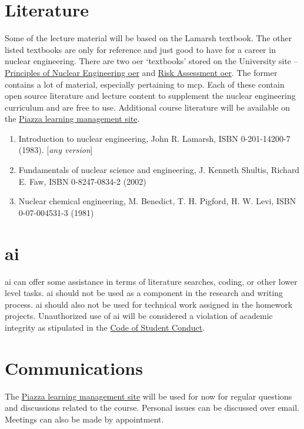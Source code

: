 \documentclass[11pt,letterpaper]{article}
\newcommand{\acf}{\acrfull} %
\newcommand{\acl}{\acrlong} %
\newcommand{\acs}{\acrshort} %
\begin{document}
\section{Literature} 
Some of the lecture material will be based on the Lamarsh textbook. The other listed textbooks are only for reference and just good to have for a career in nuclear engineering. There are two \acf{oer} `textbooks' stored on the University site -- \href{https://uidaho.pressbooks.pub/nuclearengineering/}{Principles of Nuclear Engineering \acs{oer}} and \href{https://uidaho.pressbooks.pub/riskassessment/}{Risk Assessment \acs{oer}}. The former contains a lot of material, especially pertaining to \acs{mcp}. Each of these contain open source literature and lecture content to supplement the nuclear engineering curriculum and are free to use. Additional course literature will be available on the \href{https://piazza.com/}{Piazza learning management site}. 
\begin{enumerate}[begin-vspace=0ex,item-vspace=-0.5ex,begin-extra-vspace=1ex,para-vspace=1ex,left-margin=3.9ex,item-indent=0ex,item-label=(\arabic*)]
    \item Introduction to nuclear engineering, John R. Lamarsh, ISBN 0-201-14200-7 (1983). [\textit{any version}]
    \item Fundamentals of nuclear science and engineering, J. Kenneth Shultis, Richard E. Faw, ISBN 0-8247-0834-2 (2002)
    \item Nuclear chemical engineering, M. Benedict, T. H. Pigford, H. W. Levi, ISBN 0-07-004531-3 (1981)
\end{enumerate}


\section{\acl{ai}}
\acs{ai} can offer some assistance in terms of literature searches, coding, or other lower level tasks. \acs{ai} should not be used as a component in the research and writing process. \acs{ai} should also not be used for technical work assigned in the homework projects. Unauthorized use of \acs{ai} will be considered a violation of academic integrity as stipulated in the \href{http://www.uidaho.edu/student-affairs/dean-of-students/student-conduct/student-code-of-conduct}{Code of Student Conduct}.


\section{Communications}
The \href{https://piazza.com/}{Piazza learning management site} will be used for now for regular questions and discussions related to the course. Personal issues can be discussed over email. Meetings can also be made by appointment. 
\end{document}
